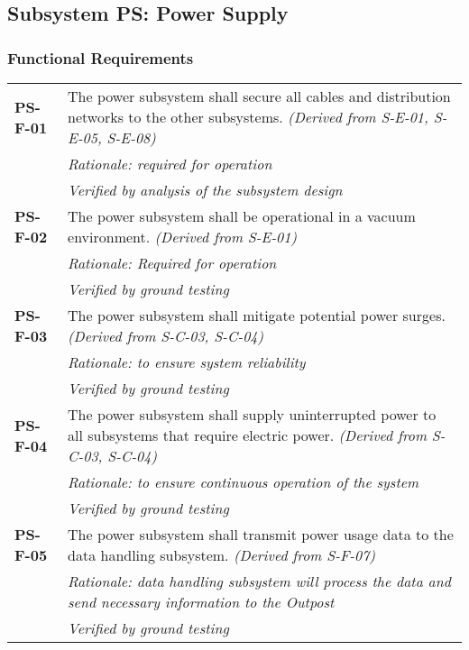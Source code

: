 \subsection{Subsystem PS: Power Supply}
\label{sect:PS_req}
\subsubsection*{Functional Requirements}
\vspace{-15pt}
\begin{longtable}{P{2cm}P{13.25cm}}
\textbf{PS-F-01}	&
The power subsystem shall secure all cables and distribution networks to the other subsystems.
\textit{(Derived from S-E-01, S-E-05, S-E-08)}	\\
& \textit{Rationale: required for operation}	\\
&\textit{Verified by analysis of the subsystem design}	\\

\textbf{PS-F-02}	&
The power subsystem shall be operational in a vacuum environment.
\textit{(Derived from S-E-01)}	\\
& \textit{Rationale: Required for operation}	\\
& \textit{Verified by ground testing}	\\

\textbf{PS-F-03}	& The power subsystem shall mitigate potential power surges. 
\textit{(Derived from S-C-03, S-C-04)} \\
& \textit{Rationale: to ensure system reliability} \\
& \textit{Verified by ground testing}	\\

\textbf{PS-F-04}	& The power subsystem shall supply uninterrupted power to all subsystems that require electric power.
\textit{(Derived from S-C-03, S-C-04)} \\
 & \textit{Rationale: to ensure continuous operation of the system} \\
 & \textit{Verified by ground testing}		\\

\textbf{PS-F-05}	& The power subsystem shall transmit power usage data to the data handling subsystem.
\textit{(Derived from S-F-07)} \\
 & \textit{Rationale: data handling subsystem will process the data and send necessary information to the Outpost} \\
 &  \textit{Verified by ground testing}		\\


\end{longtable}
